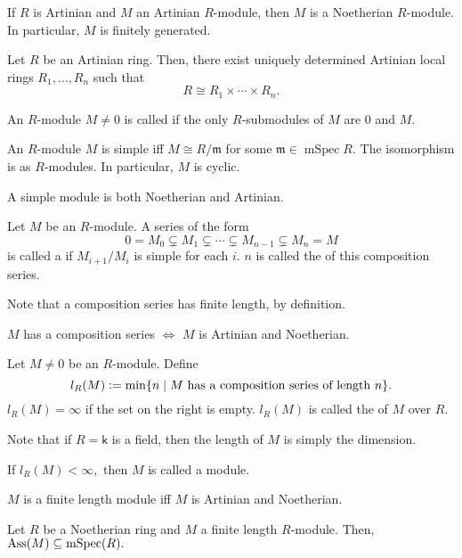 \documentclass[12pt]{article}	%
\DeclareMathOperator{\mSpec}{mSpec}
\begin{document}
\begin{prop}
	If $R$ is Artinian and $M$ an Artinian $R$-module, then $M$ is a Noetherian $R$-module. In particular, $M$ is finitely generated.
\end{prop}

\begin{thm}
	Let $R$ be an Artinian ring. Then, there exist uniquely determined Artinian local rings $R_1, \ldots, R_n$ such that
	\begin{equation*} 
		R \cong R_1 \times \cdots \times R_n.
	\end{equation*}
\end{thm}

\begin{defn}%
	An $R$-module $M \neq 0$ is called  if the only $R$-submodules of $M$ are $0$ and $M.$
\end{defn}
\begin{prop}
	An $R$-module $M$ is simple iff $M \cong R/\mathfrak{m}$ for some $\mathfrak{m} \in \mSpec R.$ The isomorphism is as $R$-modules. In particular, $M$ is cyclic.
\end{prop}
\begin{lem} 
	A simple module is both Noetherian and Artinian.
\end{lem}

\begin{defn}%
	Let $M$ be an $R$-module. A series of the form
	\begin{equation*} 
		0 = M_0 \subsetneq M_1 \subsetneq \cdots \subsetneq M_{n-1} \subsetneq M_n = M
	\end{equation*}
	is called a  if $M_{i + 1}/M_i$ is simple for each $i.$ $n$ is called the  of this composition series.
\end{defn}
Note that a composition series has finite length, by definition.

\begin{thm}
	$M$ has a composition series $\Leftrightarrow$ $M$ is Artinian and Noetherian.
\end{thm}

\begin{defn}
	Let $M \neq 0$ be an $R$-module. Define
	\begin{equation*} 
		l_R(M) \vcentcolon= \min \{n \mid M \text{ has a composition series of length }n\}.
	\end{equation*}
	$l_R(M) = \infty$ if the set on the right is empty. $l_R(M)$ is called the  of $M$ over $R.$
\end{defn}
Note that if $R = \mathsf{k}$ is a field, then the length of $M$ is simply the dimension.
\begin{defn}%
	If $l_R(M) < \infty,$ then $M$ is called a  module.
\end{defn}
\begin{prop}
	$M$ is a finite length module iff $M$ is Artinian and Noetherian.
\end{prop}
\begin{prop}
	Let $R$ be a Noetherian ring and $M$ a finite length $R$-module. Then, $\Ass(M) \subset \mSpec(R).$
\end{prop}
\end{document}
